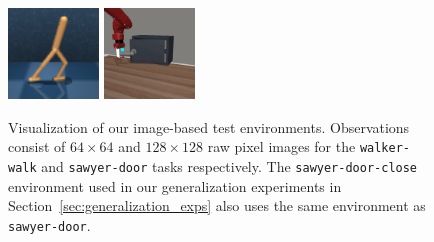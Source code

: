 \begin{figure}[!t]
    \centering
    \includegraphics[width=0.215\textwidth]{walker_task.png}
    \includegraphics[width=0.215\textwidth]{dooropen_task.png}
    \vspace{-0.2cm}
    \caption{Visualization of our image-based test environments. Observations consist of $64\times 64$ and $128\times 128$ raw pixel images for the \texttt{walker-walk} and \texttt{sawyer-door} tasks respectively. The \texttt{sawyer-door-close} environment used in our generalization experiments in Section~\ref{sec:generalization_exps} also uses the same environment as \texttt{sawyer-door}.}
    \label{fig:visual}
    \vspace{-0.7cm}
\end{figure}



